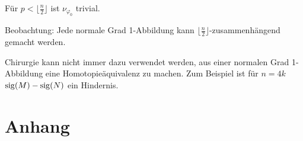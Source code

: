 \begin{korollar}
	Für $p < \lfloor \frac{n}{2} \rfloor$ ist $\nu_{\varphi_0}$ trivial.
\end{korollar}

Beobachtung: Jede normale Grad 1-Abbildung kann $\lfloor \frac{n}{2}\rfloor$-zusammenhängend gemacht werden.

\begin{bemerkung}
	Chirurgie kann nicht immer dazu verwendet werden, aus einer normalen Grad 1-Abbildung eine Homotopieäquivalenz zu machen.
	Zum Beispiel ist für $n=4k$ $\operatorname{sig}(M) - \operatorname{sig}(N)$ ein Hindernis.
\end{bemerkung}


\cleardoubleoddemptypage
{}
\setcounter{page}{1}
\cleardoubleoddemptypage
\appendix

\section{Anhang} %
\label{sec:anhang}

\printindex
\printbibliography
\listoffigures
\todototoc
{}

